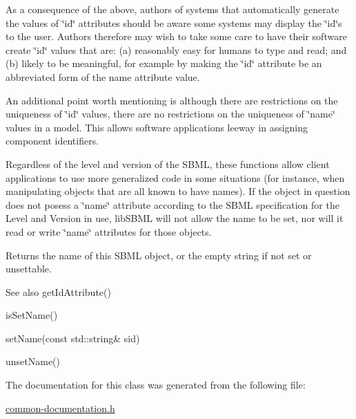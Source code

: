 As a consequence of the above, authors of systems that automatically generate the values of \char`\"{}id\char`\"{} attributes should be aware some systems may display the \char`\"{}id\char`\"{}\textquotesingle{}s to the user. Authors therefore may wish to take some care to have their software create \char`\"{}id\char`\"{} values that are\+: (a) reasonably easy for humans to type and read; and (b) likely to be meaningful, for example by making the \char`\"{}id\char`\"{} attribute be an abbreviated form of the name attribute value.

An additional point worth mentioning is although there are restrictions on the uniqueness of \char`\"{}id\char`\"{} values, there are no restrictions on the uniqueness of \char`\"{}name\char`\"{} values in a model. This allows software applications leeway in assigning component identifiers.

Regardless of the level and version of the S\+B\+ML, these functions allow client applications to use more generalized code in some situations (for instance, when manipulating objects that are all known to have names). If the object in question does not posess a \char`\"{}name\char`\"{} attribute according to the S\+B\+ML specification for the Level and Version in use, lib\+S\+B\+ML will not allow the name to be set, nor will it read or write \char`\"{}name\char`\"{} attributes for those objects.

\begin{DoxyReturn}{Returns}
the name of this S\+B\+ML object, or the empty string if not set or unsettable.
\end{DoxyReturn}
\begin{DoxySeeAlso}{See also}
get\+Id\+Attribute() 

is\+Set\+Name() 

set\+Name(const std\+::string\& sid) 

unset\+Name() 
\end{DoxySeeAlso}


The documentation for this class was generated from the following file\+:\begin{DoxyCompactItemize}
\item 
\hyperlink{common-documentation_8h}{common-\/documentation.\+h}\end{DoxyCompactItemize}
